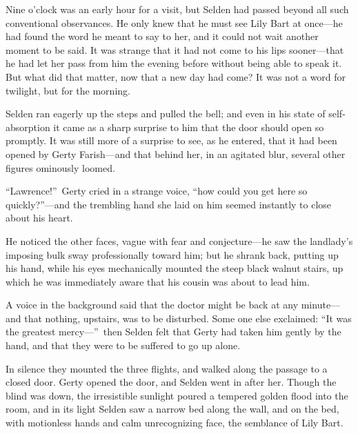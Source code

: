 \documentclass[12pt,a4paper]{book}
\begin{document}
Nine o'clock was an early hour for a visit, but Selden had passed
beyond all such conventional observances. He only knew that he
must see Lily Bart at once---he had found the word he meant to say
to her, and it could not wait another moment to be said. It was
strange that it had not come to his lips sooner---that he had let
her pass from him the evening before without being able to speak
it. But what did that matter, now that a new day had come? It was
not a word for twilight, but for the morning.





Selden ran eagerly up the steps and pulled the bell; and even in
his state of self-absorption it came as a sharp surprise to him
that the door should open so promptly. It was still more
of a surprise to see, as he entered, that it had been opened by
Gerty Farish---and that behind her, in an agitated blur, several
other figures ominously loomed.





``Lawrence!''\ Gerty cried in a strange voice, ``how could you get
here so quickly?''---and the trembling hand she laid on him seemed
instantly to close about his heart.





He noticed the other faces, vague with fear and conjecture---he
saw the landlady's imposing bulk sway professionally toward him;
but he shrank back, putting up his hand, while his eyes
mechanically mounted the steep black walnut stairs, up which he
was immediately aware that his cousin was about to lead him.





A voice in the background said that the doctor might be back at
any minute---and that nothing, upstairs, was to be disturbed. Some
one else exclaimed: ``It was the greatest mercy---''\ then Selden
felt that Gerty had taken him gently by the hand, and that they
were to be suffered to go up alone.





In silence they mounted the three flights, and walked along the
passage to a closed door. Gerty opened the door, and Selden went
in after her. Though the blind was down, the irresistible
sunlight poured a tempered golden flood into the room, and in its
light Selden saw a narrow bed along the wall, and on the bed,
with motionless hands and calm unrecognizing face, the semblance
of Lily Bart.
\end{document}
